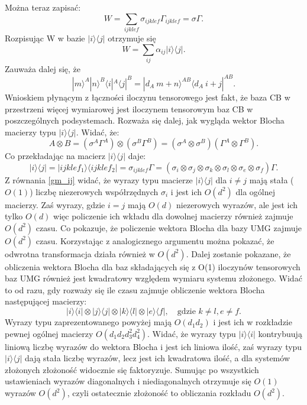 \documentclass[10pt]{article} %
\newcommand{\Ket}[1]{|#1\rangle}
\newcommand{\Bra}[1]{\langle#1|}
\begin{document}
\begin{appendices}
Można teraz zapisać:
\begin{equation}
\label{WGM}
W = \sum_{ijklef} \sigma_{ijklef} \Gamma_{ijklef} = \sigma \Gamma.
\end{equation}
Rozpisując W w bazie $\Ket{i}\Bra{j}$ otrzymuje się
\begin{equation}
W = \sum_{ij} \alpha_{ij} \Ket{i}\Bra{j}.
\end{equation}
Zauważa dalej się, że
\begin{equation}
\Ket{m}^A\Ket{n}^B\Bra{i}^A\Bra{j}^B = \Ket{d_A~m+n}^{AB}\Bra{d_A~i+j}^{AB}.
\end{equation} Wnioskiem płynącym z łączności iloczynu tensorowego jest fakt, że baza CB w przestrzeni więcej wymiarowej jest iloczynem tensorowym baz CB w poszczególnych podsystemach.
Rozważa się dalej, jak wygląda wektor Blocha macierzy typu $\Ket{i}\Bra{j}$.
Widać, że:
\begin{equation}
A \otimes B = (\sigma^A \Gamma^A) \otimes (\sigma^B \Gamma^B) = (\sigma^A \otimes \sigma^B) (\Gamma^A \otimes \Gamma^B).
\end{equation} Co przekładając na macierz $\Ket{i}\Bra{j}$ daje:
\begin{equation}
\Ket{i}\Bra{j}=\Ket{ijklef_1}\Bra{ijklef_2} =  \sigma_{ijklef} \Gamma = (\sigma_i \otimes \sigma_j \otimes \sigma_k \otimes \sigma_l \otimes \sigma_e \otimes \sigma_f) \Gamma.
\end{equation}
Z równania \eqref{gm_ij} widać, że wyrazy typu macierze $\Ket{i}\Bra{j}$ dla $i \neq j$ mają stała ($O(1)$) liczbę niezerowych współrzędnych $\sigma_i$ i jest ich $O(d^2)$ dla ogólnej macierzy. Zaś wyrazy, gdzie $i = j$ mają $O(d)$ niezerowych wyrazów, ale jest ich tylko $O(d)$ więc policzenie ich wkładu dla dowolnej macierzy również zajmuje 
$O(d^2)$ czasu. Co pokazuje, że policzenie wektora Blocha dla bazy UMG zajmuje $O(d^2)$ czasu. Korzystając z analogicznego argumentu można pokazać, że odwrotna transformacja działa również w $O(d^2)$. Dalej zostanie pokazane, że obliczenia wektora Blocha dla baz składających się z O(1) iloczynów tensorowych baz UMG również jest kwadratowy względem wymiaru systemu złożonego. Widać to od razu, gdy rozważy się ile czasu zajmuje obliczenie wektora Blocha następującej macierzy:
\begin{equation}
\Ket{i}\Bra{i} \otimes \Ket{j}\Bra{j} \otimes \Ket{k}\Bra{l} \otimes \Ket{e}\Bra{f}, \quad \text{gdzie }k \neq l, e \neq f.
\end{equation} Wyrazy typu zaprezentowanego powyżej mają $O(d_1d_2)$ i jest ich w rozkładzie pewnej ogólnej macierzy $O(d_1d_2d_3^2d_4^2)$. Widać, że wyrazy typu $\Ket{i}\Bra{i}$ kontrybuują liniową liczbę wyrazów do wektora Blocha i jest ich liniowa ilość, zaś wyrazy typu $\Ket{i}\Bra{j}$ dają stała liczbę wyrazów, lecz jest ich kwadratowa ilość, a dla systemów złożonych złożoność widocznie się faktoryzuje. Sumując po wszystkich ustawieniach wyrazów diagonalnych i niediagonalnych otrzymuje się $O(1)$ wyrazów $O(d^2)$, czyli ostatecznie złożoność to obliczania rozkładu $O(d^2)$.

\end{appendices}
\end{document}
